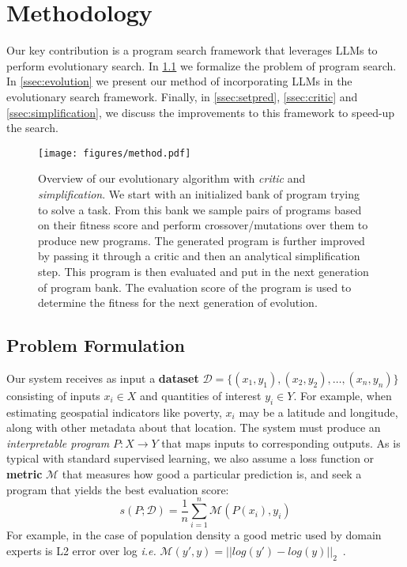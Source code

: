 \section{Methodology}
\label{sec:method}
Our key contribution is a program search framework that leverages LLMs to perform evolutionary search. In \cref{ssec:formulation} we formalize the problem of program search.
In \cref{ssec:evolution} we present our method of incorporating LLMs in the evolutionary search framework. 
Finally, in \cref{ssec:setpred}, \ref{ssec:critic} and \ref{ssec:simplification}, we discuss the improvements to this framework to speed-up the search.

\begin{figure*}[ht]
    \centering
\texttt{[image: figures/method.pdf]}
\caption{Overview of our evolutionary algorithm with \textit{critic} and \textit{simplification}. We start with an initialized bank of program trying to solve a task. From this bank we sample pairs of programs based on their fitness score and perform crossover/mutations over them to produce new programs. The generated program is further improved by passing it through a critic and then an analytical simplification step. This program is then evaluated and put in the next generation of program bank. The evaluation score of the program is used to determine the fitness for the next generation of evolution.}
\label{fig:pipeline}
\end{figure*}


\subsection{Problem Formulation}\label{ssec:formulation}
Our system receives as input a \textbf{dataset} $\mathcal{D} = \{(x_1, y_1), (x_2, y_2), \dots, (x_n, y_n)\}$ consisting of inputs $x_i \in X$ and quantities of interest $y_i \in Y$.
For example, when estimating geospatial indicators like poverty, $x_i$ may be a latitude and longitude, along with other metadata about that location.
The system must produce an \emph{interpretable program} $P: X \rightarrow Y$ that maps inputs to corresponding outputs.
As is typical with standard supervised learning, we also assume a loss function or \textbf{metric} $\mathcal{M}$ that measures how good a particular prediction is, and seek a program that yields the best evaluation score:
\begin{equation}
\label{eq:score}
s(P; \mathcal{D}) = \frac{1}{n}\sum_{i=1}^{n}\mathcal{M} (P(x_i), y_i)    
\end{equation}
For example, in the case of population density a good metric used by domain experts is L2 error over log \textit{i.e.} $\mathcal{M}(y', y) = ||log(y')-log(y)||_2$~\citep{metzger-22,metzger-24}.



